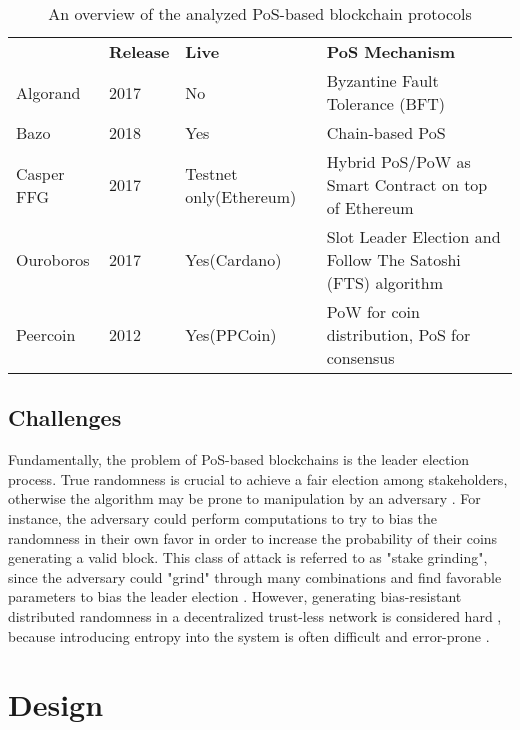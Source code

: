 \documentclass[12pt,a4]{article}
\begin{document}
\begin{table}[hbt]
  \centering
  \centering
  \begin{tabularx}{\textwidth}{llp{2.4cm}X}
    \rowcolor{white}
    & \textbf{Release} & \textbf{Live} & \textbf{PoS Mechanism} \\
    Algorand & 2017 & No & Byzantine Fault Tolerance (BFT) \\
    Bazo & 2018 & Yes & Chain-based PoS \\
    Casper FFG & 2017 & Testnet only\newline (Ethereum) & Hybrid PoS/PoW as Smart Contract on top of Ethereum \\
    Ouroboros & 2017 & Yes\newline (Cardano) & Slot Leader Election and Follow The Satoshi (FTS) algorithm \\
    Peercoin & 2012 & Yes\newline (PPCoin) & PoW for coin distribution, PoS for consensus
  \end{tabularx}
  \caption{An overview of the analyzed PoS-based blockchain protocols}
\end{table}


\subsection{Challenges}
\label{Background:Challenges}

Fundamentally, the problem of PoS-based blockchains is the leader election process. True randomness is crucial to achieve a fair election among stakeholders, otherwise the algorithm may be prone to manipulation by an adversary \cite{Kiayias17}. For instance, the adversary could perform computations to try to bias the randomness in their own favor in order to increase the probability of their coins generating a valid block. This class of attack is referred to as "stake grinding", since the adversary could "grind" through many combinations and find favorable parameters to bias the leader election \cite{ButerinPOS16}. However, generating bias-resistant distributed randomness in a decentralized trust-less network is considered hard \cite{Syta16}, because introducing entropy into the system is often difficult and error-prone \cite{Schneier98, Gutterman06, Chirgwin14}.

\section{Design}
\label{Section:Design}
\end{document}
